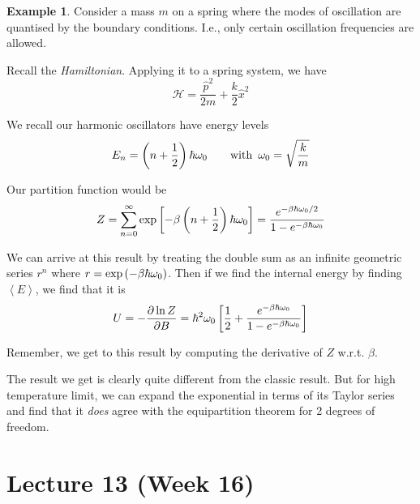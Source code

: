 \documentclass[12pt,chapterprefix=false,dvipsnames]{scrbook}
\theoremstyle{dotless}
\theoremstyle{definition}
\newtheorem{protoexample}{Example}[section]
\newenvironment{example}
{\colorlet{shadecolor}{red!15}\begin{shaded}\begin{protoexample}}
			{\end{protoexample}\end{shaded}}
\newcommand{\Hamiltonian}{\mathcal{H}}
\begin{document}
\begin{example}
	Consider a mass $m$ on a spring where the
	modes of oscillation are quantised by the boundary conditions.
	I.e., only certain oscillation frequencies are allowed.

	Recall the \textit{Hamiltonian}. Applying it to a spring
	system, we have
	\begin{equation}
		\Hamiltonian = \frac{ \hat{p}^2 }{2m} + \frac{k}{2}
		\hat{x}^2
	\end{equation}

	We recall our harmonic oscillators have energy levels
	\begin{equation}
		E_n = \left( n + \frac{1}{2}\right) \hbar \omega_0
		\hspace{2em} \mathrm{with}
		\hspace{.5em} \omega_0 = \sqrt{\frac{k}{m}}
	\end{equation}

	Our partition function would be
	\begin{equation}
		Z = \sum_{n=0}^\infty \exponential{\left[ -\beta \left( n +\frac{1}{2} \right) \hbar \omega_0 \right]} =
		\frac{e^{-\beta \hbar \omega_0 / 2}}{1 - e^{-\beta \hbar \omega_0}}
	\end{equation}

	We can arrive at this result by treating the double sum as an
	infinite geometric series $r^n$ where
	$r = \exponential{\left(-\beta\hbar\omega_0\right)}$.  Then if we find the internal energy by
	finding $\left<E\right>$, we find that it is
	\begin{equation}
		U = -\pdv{\naturallogarithm{Z}}{B} = \hbar^2 \omega_0
		\left[\frac{1}{2} +
		\frac{e^{-\beta \hbar \omega_0}}{1-e^{-\beta\hbar\omega_0}}
		\right]
	\end{equation}

	Remember, we get to this result by computing the derivative of
	$Z$ w.r.t. $\beta$.

	The result we get is clearly quite different from the classic
	result. But for high temperature limit, we can expand the
	exponential in terms of its Taylor series and find that it
	\textit{does} agree with the equipartition theorem for
	2 degrees of freedom.
\end{example}

\chapter{Lecture 13 (Week 16)}%
\label{cha:lecture_13}
\end{document}

